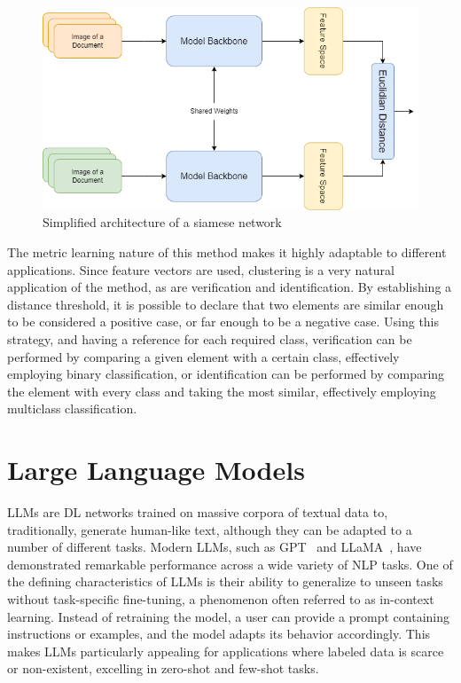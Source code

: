 \begin{figure}[htbp]
\centering
\includegraphics[width=0.9\linewidth]{images/siamese.png}
\caption{Simplified architecture of a siamese network}
\label{fig:siamese}
\end{figure}

The metric learning nature of this method makes it highly adaptable to different applications. Since feature vectors are used, clustering is a very natural application of the method, as are verification and identification. By establishing a distance threshold, it is possible to declare that two elements are similar enough to be considered a positive case, or far enough to be a negative case. Using this strategy, and having a reference for each required class, verification can be performed by comparing a given element with a certain class, effectively employing binary classification, or identification can be performed by comparing the element with every class and taking the most similar, effectively employing multiclass classification.

\section{Large Language Models}

\glspl{LLM} are \gls{DL} networks trained on massive corpora of textual data to, traditionally, generate human-like text, although they can be adapted to a number of different tasks. Modern LLMs, such as GPT~\cite{brown_language_2020} and LLaMA~\cite{touvron_llama_2023}, have demonstrated remarkable performance across a wide variety of \gls{NLP} tasks. One of the defining characteristics of LLMs is their ability to generalize to unseen tasks without task-specific fine-tuning, a phenomenon often referred to as in-context learning. Instead of retraining the model, a user can provide a prompt containing instructions or examples, and the model adapts its behavior accordingly. This makes LLMs particularly appealing for applications where labeled data is scarce or non-existent, excelling in zero-shot and few-shot tasks.

